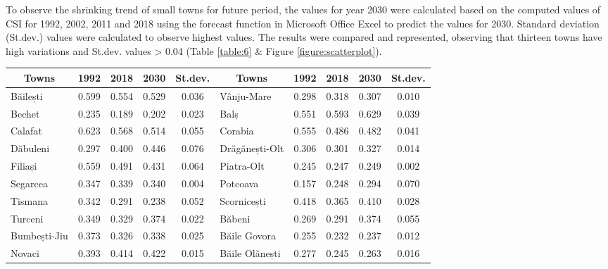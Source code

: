 To observe the shrinking trend of small towns for future period, the values for year 2030 were calculated based on the computed values of CSI for 1992, 2002, 2011 and 2018 using the forecast function in Microsoft Office Excel to predict the values for 2030. Standard deviation (St.dev.) values were calculated to observe highest values. The results were compared and represented, observing that thirteen towns have high variations and St.dev. values > 0.04 (Table \ref{table:6} \& Figure \ref{figure:scatterplot}).

\begin{table}[ht]
	\centering
	\footnotesize
	\begin{tabular}{ lcccc|lcccc }
		\toprule
		\multicolumn{1}{c}{Towns} & 1992  & 2018  & 2030  & St.dev. & \multicolumn{1}{c}{Towns} & 1992  & 2018  & 2030  & St.dev. \\
		\midrule
		Băilești                    & 0.599 & 0.554 & 0.529 & 0.036   & Vânju-Mare                  & 0.298 & 0.318 & 0.307 & 0.010   \\
		Bechet                      & 0.235 & 0.189 & 0.202 & 0.023   & Balș                        & 0.551 & 0.593 & 0.629 & 0.039   \\
		Calafat                     & 0.623 & 0.568 & 0.514 & 0.055   & Corabia                     & 0.555 & 0.486 & 0.482 & 0.041   \\
		Dăbuleni                    & 0.297 & 0.400 & 0.446 & 0.076   & Drăgănești-Olt              & 0.306 & 0.301 & 0.327 & 0.014   \\
		Filiași                     & 0.559 & 0.491 & 0.431 & 0.064   & Piatra-Olt                  & 0.245 & 0.247 & 0.249 & 0.002   \\
		Segarcea                    & 0.347 & 0.339 & 0.340 & 0.004   & Potcoava                    & 0.157 & 0.248 & 0.294 & 0.070   \\
		Tismana                     & 0.342 & 0.291 & 0.238 & 0.052   & Scornicești                 & 0.418 & 0.365 & 0.410 & 0.028   \\
		Turceni                     & 0.349 & 0.329 & 0.374 & 0.022   & Băbeni                      & 0.269 & 0.291 & 0.374 & 0.055   \\
		Bumbești-Jiu                & 0.373 & 0.326 & 0.338 & 0.025   & Băile Govora                & 0.255 & 0.232 & 0.237 & 0.012   \\
		Novaci                      & 0.393 & 0.414 & 0.422 & 0.015   & Băile Olănești              & 0.277 & 0.245 & 0.263 & 0.016   \\

\end{tabular}
\end{table}
